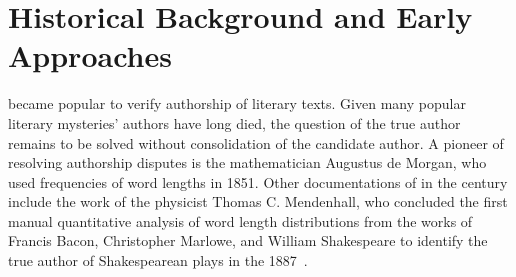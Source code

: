 \section{Historical Background and Early Approaches}

\ai{} became popular to verify authorship of literary texts.
Given many popular literary mysteries' authors have long died, the question of the true author remains to be solved without consolidation of the candidate author.
A pioneer of resolving authorship disputes is the mathematician Augustus de Morgan, who used frequencies of word lengths in 1851.
Other documentations of \ai{} in the  century include the work of the physicist Thomas C. Mendenhall, who concluded the first manual quantitative analysis of word length distributions from the works of Francis Bacon, Christopher Marlowe, and William Shakespeare to identify the true author of Shakespearean plays in the 1887~\citep{neal_surveying_2018,stamatatos_survey_2009}.

